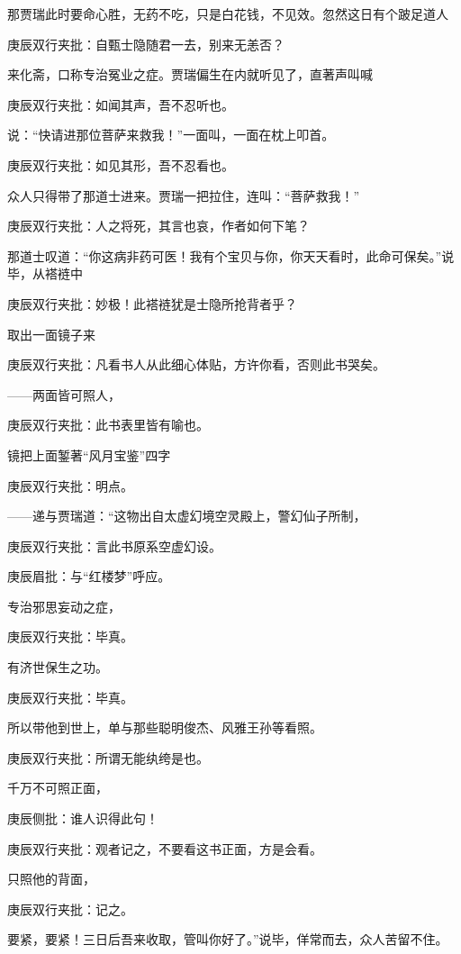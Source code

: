 \begin{parag}
    那贾瑞此时要命心胜，无药不吃，只是白花钱，不见效。忽然这日有个跛足道人\begin{note}庚辰双行夹批：自甄士隐随君一去，别来无恙否？\end{note}来化斋，口称专治冤业之症。贾瑞偏生在内就听见了，直著声叫喊\begin{note}庚辰双行夹批：如闻其声，吾不忍听也。\end{note}说：“快请进那位菩萨来救我！”一面叫，一面在枕上叩首。\begin{note}庚辰双行夹批：如见其形，吾不忍看也。\end{note}众人只得带了那道士进来。贾瑞一把拉住，连叫：“菩萨救我！”\begin{note}庚辰双行夹批：人之将死，其言也哀，作者如何下笔？\end{note}那道士叹道：“你这病非药可医！我有个宝贝与你，你天天看时，此命可保矣。”说毕，从褡裢中\begin{note}庚辰双行夹批：妙极！此褡裢犹是士隐所抢背者乎？\end{note}取出一面镜子来\begin{note}庚辰双行夹批：凡看书人从此细心体贴，方许你看，否则此书哭矣。\end{note}——两面皆可照人，\begin{note}庚辰双行夹批：此书表里皆有喻也。\end{note}镜把上面錾著“风月宝鉴”四字\begin{note}庚辰双行夹批：明点。\end{note}——递与贾瑞道：“这物出自太虚幻境空灵殿上，警幻仙子所制，\begin{note}庚辰双行夹批：言此书原系空虚幻设。\end{note}\begin{note}庚辰眉批：与“红楼梦”呼应。\end{note}专治邪思妄动之症，\begin{note}庚辰双行夹批：毕真。\end{note}有济世保生之功。\begin{note}庚辰双行夹批：毕真。\end{note}所以带他到世上，单与那些聪明俊杰、风雅王孙等看照。\begin{note}庚辰双行夹批：所谓无能纨绔是也。\end{note}千万不可照正面，\begin{note}庚辰侧批：谁人识得此句！\end{note}\begin{note}庚辰双行夹批：观者记之，不要看这书正面，方是会看。\end{note}只照他的背面，\begin{note}庚辰双行夹批：记之。\end{note}要紧，要紧！三日后吾来收取，管叫你好了。”说毕，佯常而去，众人苦留不住。
\end{parag}


